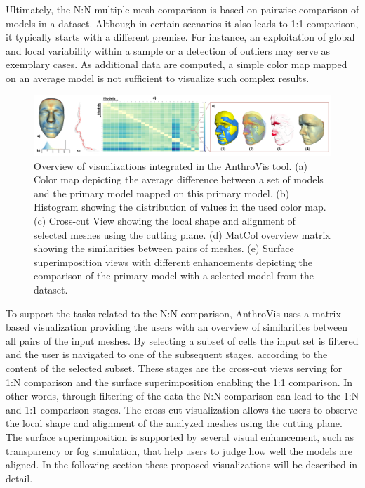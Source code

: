 \documentclass[final,5p,times]{elsarticle}
\begin{document}
Ultimately, the N:N multiple mesh comparison is based on pairwise comparison of models in a dataset. 
Although in certain scenarios it also leads to 1:1 comparison, it typically starts with a different premise.
For instance, an exploitation of global and local variability within a sample or a detection of outliers may serve as exemplary cases.
As additional data are computed, a simple color map mapped on an average model is not sufficient to visualize such complex results.

\begin{figure}[htb]
	\centering
  \includegraphics[width=1.0\linewidth]{pictures/overview4.png}
  \caption{\label{fig:overview}Overview of visualizations integrated in the AnthroVis tool. (a) Color map depicting the average difference between a set of models and the primary model mapped on this primary model. (b) Histogram showing the distribution of values in the used color map. (c) Cross-cut View showing the local shape and alignment of selected meshes using the cutting plane. (d) MatCol overview matrix showing the similarities between pairs of meshes. (e) Surface superimposition views with different enhancements depicting the comparison of the primary model with a selected model from the dataset.}
\vspace{-2mm}
\end{figure}

To support the tasks related to the N:N comparison, AnthroVis uses a matrix based visualization providing the users with an overview of similarities between all pairs of the input meshes.
By selecting a subset of cells the input set is filtered and the user is navigated to one of the subsequent stages, according to the content of the selected subset.
These stages are the cross-cut views serving for 1:N comparison and the surface superimposition enabling the 1:1 comparison.
In other words, through filtering of the data the N:N comparison can lead to the 1:N and 1:1 comparison stages.
The cross-cut visualization allows the users to observe the local shape and alignment of the analyzed meshes using the cutting plane.
The surface superimposition is supported by several visual enhancement, such as transparency or fog simulation, that help users to judge how well the models are aligned.
In the following section these proposed visualizations will be described in detail.
\end{document}
